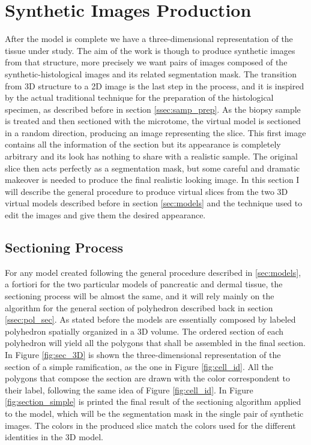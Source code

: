 \section{Synthetic Images Production} \label{sec:synth_image}
After the model is complete we have a three-dimensional representation of the tissue under study. The aim of the work is though to produce synthetic images from that structure, more precisely we want pairs of images composed of the synthetic-histological images and its related segmentation mask. The transition from 3D structure to a 2D image is the last step in the process, and it is inspired by the actual traditional technique for the preparation of the histological specimen, as described before in section \ref{ssec:samp_prep}. As the biopsy sample is treated and then sectioned with the microtome, the virtual model is sectioned in a random direction, producing an image representing the slice. This first image contains all the information of the section but its appearance is completely arbitrary and its look has nothing to share with a realistic sample. The original slice then acts perfectly as a segmentation mask, but some careful and dramatic makeover is needed to produce the final realistic looking image. In this section I will describe the general procedure to produce virtual slices from the two 3D virtual models described before in section \ref{sec:models} and the technique used to edit the images and give them the desired appearance.

\subsection{Sectioning Process} \label{ssec:sect_proc}
For any model created following the general procedure described in \ref{sec:models}, a fortiori for the two particular models of pancreatic and dermal tissue, the sectioning process will be almost the same, and it will rely mainly on the algorithm for the general section of polyhedron described back in section \ref{ssec:pol_sec}. As stated before the models are essentially composed by labeled polyhedron spatially organized in a 3D volume. The ordered section of each polyhedron will yield all the polygons that shall be assembled in the final section.
In Figure \ref{fig:sec_3D} is shown the three-dimensional representation of the section of a simple ramification, as the one in Figure \ref{fig:cell_id}. All the polygons that compose the section are drawn with the color correspondent to their label, following the same idea of Figure \ref{fig:cell_id}. In Figure \ref{fig:section_simple} is printed the final result of the sectioning algorithm applied to the model, which will be the segmentation mask in the single pair of synthetic images. The colors in the produced slice match the colors used for the different identities in the 3D model.


